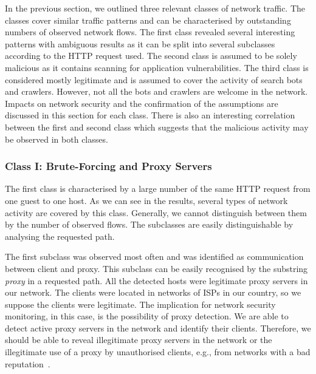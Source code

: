 In the previous section, we outlined three relevant classes of network traffic. The classes cover similar traffic patterns and can be characterised by outstanding numbers of observed network flows. The first class revealed several interesting patterns with ambiguous results as it can be split into several subclasses according to the HTTP request used. The second class is assumed to be solely malicious as it contains scanning for application vulnerabilities. The third class is considered mostly legitimate and is assumed to cover the activity of search bots and crawlers. However, not all the bots and crawlers are welcome in the network. Impacts on network security and the confirmation of the assumptions are discussed in this section for each class. There is also an interesting correlation between the first and second class which suggests that the malicious activity may be observed in both classes.

\subsubsection{Class I: Brute-Forcing and Proxy Servers}

The first class is characterised by a large number of the same HTTP request from one guest to one host. As we can see in the results, several types of network activity are covered by this class. Generally, we cannot distinguish between them by the number of observed flows. The subclasses are easily distinguishable by analysing the requested path.

The first subclass was observed most often and was identified as communication between client and proxy. This subclass can be easily recognised by the substring \textit{proxy} in a requested path. All the detected hosts were legitimate proxy servers in our network. The clients were located in networks of ISPs in our country, so we suppose the clients were legitimate. The implication for network security monitoring, in this case, is the possibility of proxy detection. We are able to detect active proxy servers in the network and identify their clients. Therefore, we should be able to reveal illegitimate proxy servers in the network or the illegitimate use of a proxy by unauthorised clients, e.g., from networks with a bad reputation~\cite{MoreiraMoura-2013-Internet}.

